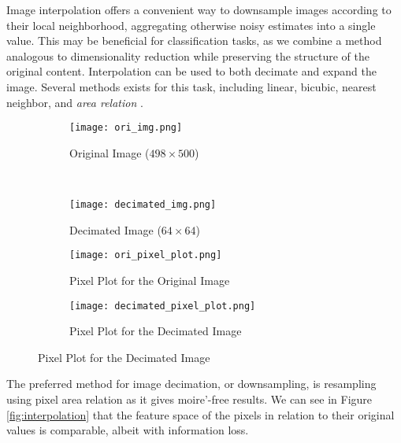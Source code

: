 \documentclass{article}
\begin{document}
Image interpolation offers a convenient way to downsample images according to
their local neighborhood, aggregating otherwise noisy estimates into a single
value. This may be beneficial for classification tasks, as we combine a method
analogous to dimensionality reduction while preserving the structure of
the original content.
Interpolation can be used to both decimate and expand the image. Several
methods exists for this task, including linear, bicubic, nearest neighbor, and
\textit{area relation} \cite{opencv}.

\begin{figure}[h!]
  \centering
  \caption{Results of Interpolating a 249,000 pixel image to a 4,096 pixel image.}
  \vspace{-5pt}
  \label{fig:interpolation}
  \begin{subfigure}[b]{0.45\textwidth}
    \centering
    \texttt{[image: ori\_img.png]}
    \vspace{-10pt}
    \caption{Original Image ($498 \times 500$)}
    \label{fig:ori-image}
  \end{subfigure}
  ~
  \begin{subfigure}[b]{0.45\textwidth}
    \centering
    \texttt{[image: decimated\_img.png]}
    \vspace{-10pt}
    \caption{Decimated Image ($64 \times 64$)}
    \label{fig:reduced-img}
  \end{subfigure}

  \begin{subfigure}[b]{0.45\textwidth}
    \centering
    \texttt{[image: ori\_pixel\_plot.png]}
    \caption{Pixel Plot for the Original Image}
    \label{fig:ori-pixel-plot}
  \end{subfigure}
  \begin{subfigure}[b]{0.45\textwidth}
    \centering
    \texttt{[image: decimated\_pixel\_plot.png]}
    \caption{Pixel Plot for the Decimated Image}
    \label{fig:reduced-pixel-plot}
  \end{subfigure}
\end{figure}

The preferred method for image decimation, or downsampling, is
resampling using pixel area relation as it gives moire'-free results. We can
see in Figure \ref{fig:interpolation} that the feature space of the pixels in
relation to their original values is comparable, albeit with information loss.

\end{document}

